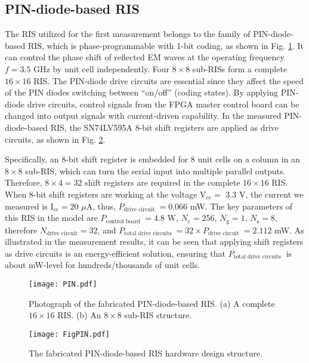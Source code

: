 \documentclass[journal]{IEEEtran}
\begin{document}
\subsection{PIN-diode-based RIS}

The RIS utilized for the first measurement belongs to the family of PIN-diode-based RIS, which is phase-programmable with 1-bit coding, as shown in Fig. \ref{2}. It can control the phase shift of reflected EM waves at the operating frequency $f=3.5$ GHz by unit cell independently. Four $8 \times 8$ sub-RISs form a complete $16 \times 16$ RIS. The PIN-diode drive circuits are essential since they affect the speed of the PIN diodes switching between “on/off” (coding states). By applying PIN-diode drive circuits, control signals from the FPGA master control board can be changed into output signals with current-driven capability. In the measured PIN-diode-based RIS, the SN74LV595A 8-bit shift registers are applied as drive circuits, as shown in Fig. \ref{3}. 

Specifically, an 8-bit shift register is embedded for 8 unit cells on a column in an $8 \times 8$ sub-RIS, which can turn the serial input into multiple parallel outputs. Therefore, $8 \times 4=32$ shift registers are required in the complete $16 \times 16$ RIS. When 8-bit shift registers are working at the voltage $\mathrm{V}_\text {cc} =$ 3.3 V, the current we measured is $\mathrm{I}_\text {cc}  = 20 $ $\mu$A, thus, $P_{\text {drive circuit }} = 0.066$ mW. The key parameters of this RIS in the model are $P_{\text {control board }} = 4.8$ W, $N_{\mathrm{c}}=256$, $N_{\mathrm{g}}=1$, $N_{\mathrm{s}}=8$, therefore $N_{\text {drive circuit}}= 32$, and $P_{\text {total drive circuits }}= 32 \times P_{\text {drive circuit }}= 2.112 $ mW. As illustrated in the measurement results, it can be seen that applying shift registers as drive circuits is an energy-efficient solution, ensuring that $P_{\text {total drive circuits }}$ is about mW-level for hundreds/thousands of unit cells.

\begin{figure}
\centering
\texttt{[image: PIN.pdf]}
\caption{Photograph of the fabricated PIN-diode-based RIS. (a) A complete $16 \times 16$ RIS. (b) An $8 \times 8$ sub-RIS structure.}
\label{2} 
\end{figure}
\begin{figure}
\centering
\texttt{[image: FigPIN.pdf]}
\caption{The fabricated PIN-diode-based RIS hardware design structure.}
\vspace{-0.2cm}
\label{3}
\end{figure}
\end{document}
